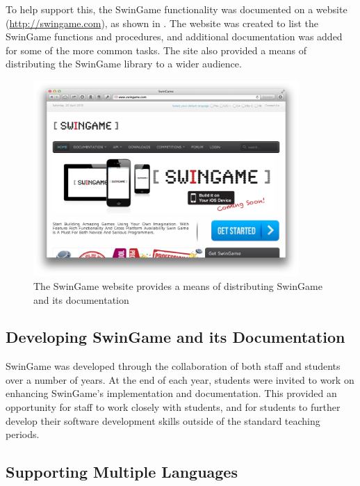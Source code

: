 To help support this, the SwinGame functionality was documented on a website (\url{http://swingame.com}), as shown in . The website was created to list the SwinGame functions and procedures, and additional documentation was added for some of the more common tasks. The site also provided a means of distributing the SwinGame library to a wider audience.  

\begin{figure}[thbp]
  \centering
  \includegraphics[width=0.9\textwidth]{SwinGame}
  \caption{The SwinGame website provides a means of distributing SwinGame and its documentation}
  \label{fig:website}
\end{figure}


\subsection{Developing SwinGame and its Documentation} %
\label{sub:developing_swingame_and_its_documentation}

SwinGame was developed through the collaboration of both staff and students over a number of years. At the end of each year, students were invited to work on enhancing SwinGame's implementation and documentation. This provided an opportunity for staff to work closely with students, and for students to further develop their software development skills outside of the standard teaching periods.


\subsection{Supporting Multiple Languages} %
\label{sub:supporting_multiple_languages}

